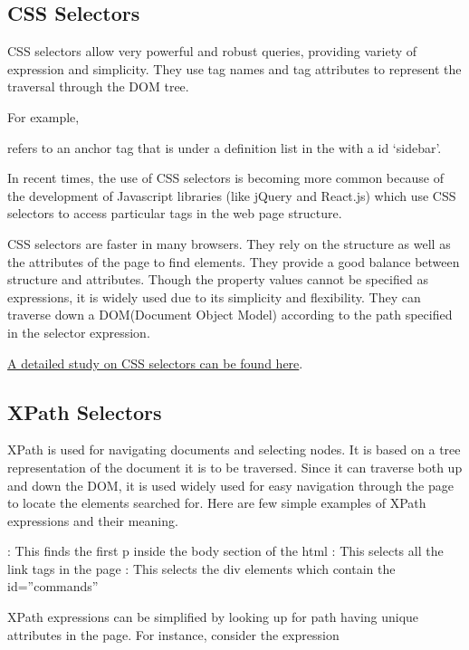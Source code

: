 \documentclass[letterpaper,12pt,english]{sphinxmanual}
\begin{document}
\subsection{CSS Selectors}
\label{concepts/selectors:css-selectors}
CSS selectors allow very powerful and robust queries, providing variety of expression and simplicity. They use tag names and tag attributes to represent the traversal through the DOM tree.

For example,

 refers to an anchor tag that is under a definition list in the  with a id `sidebar'.

In recent times, the use of CSS selectors is becoming more common because of the development of Javascript libraries (like jQuery and React.js) which use CSS selectors to access particular tags in the web page structure.

CSS selectors are faster in many browsers. They rely on the structure as well as the attributes of the page to find elements. They provide a good balance between structure and attributes. Though the property values cannot be specified as expressions, it is widely used due to its simplicity and flexibility. They can traverse down a DOM(Document Object Model) according to the path specified in the selector expression.

\href{http://www.w3.org/TR/CSS21/selector.html}{A detailed study on CSS selectors can be found here}.


\subsection{XPath Selectors}
\label{concepts/selectors:xpath-selectors}
XPath is used for navigating documents and selecting nodes. It is based on a tree representation of the document it is to be traversed. Since it can traverse both up and down the DOM, it is used widely used for easy navigation through the page to locate the elements searched for.
Here are few simple examples of XPath expressions and their meaning.

 : This finds the first p inside the body section of the html
 : This selects all the link tags in the page
 : This selects the div elements which contain the id=''commands''

XPath expressions can be simplified by looking up for path having unique attributes in the page. For instance, consider the expression
\end{document}
